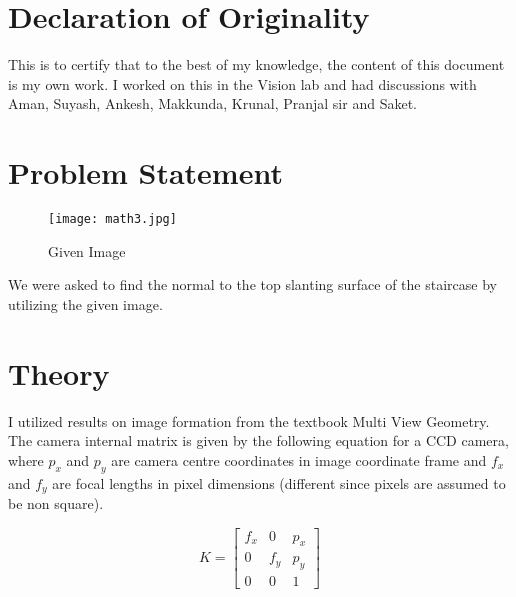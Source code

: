 \documentclass[12pt]{article}
\author{
  Singhal, Madhur\\
  \texttt{2015CS10235}
}
\begin{document}
\maketitle


\section{Declaration of Originality}
This is to certify that to the best of my knowledge, the content of this document is my own work. I worked on this in the Vision lab and had discussions with Aman, Suyash, Ankesh, Makkunda, Krunal, Pranjal sir and Saket.

\section{Problem Statement}
\begin{figure}[ht!]
    \centering
    \texttt{[image: math3.jpg]}
    \caption{Given Image}
    \label{giv}
\end{figure}
We were asked to find the normal to the top slanting surface of the staircase by utilizing the given image.
\section{Theory}

I utilized results on image formation from the textbook Multi View Geometry. The camera internal matrix is given by the following equation for a CCD camera, where $p_x$ and $p_y$ are camera centre coordinates in image coordinate frame and $f_x$ and $f_y$ are focal lengths in pixel dimensions (different since pixels are assumed to be non square).

$$ K=  \begin{bmatrix}f_x &0&p_x\\0 & f_y&p_y\\0 & 0 & 1 \end{bmatrix} $$
\end{document}
